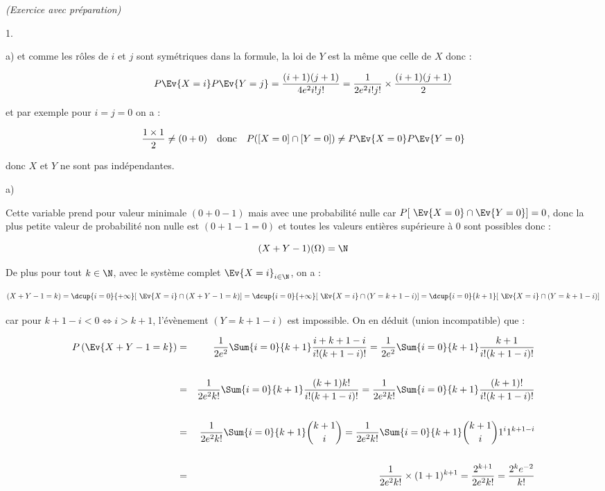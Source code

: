 \documentclass[11pt]{article}%
\begin{document}
\begin{exercice}{\it (Exercice avec préparation)}
\begin{noliste}{1.}
\begin{noliste}{a)}
 et comme les rôles de $i$ et $j$ sont symétriques dans la formule, la
loi de $Y$ est la même que celle de $X$ donc : 
 
\[
 P \Ev{X = i } P \Ev{ Y = j } = \frac{ (i + 1) ( j + 1) }{ 4 e^{2} i!
j! } = \frac{ 1 }{ 2 e^{2} i! j! } \times \frac{ (i + 1 ) (j + 1) }{ 2
} 
\]

 et par exemple pour $i = j = 0$ on a : 
 
\[
 \frac{ 1 \times 1 }{ 2 } \neq (0 + 0) \ \ \text{ donc } \ \ P ( [X =
0] \cap [Y = 0] ) \neq P \Ev{X = 0} P \Ev{ Y = 0 } 
\]

 donc $X$ et $Y$ ne sont pas indépendantes. \\

 \end{noliste}

 \item \begin{noliste}{a)}
 \setlength{\itemsep}{2mm}

 \item Cette variable prend pour valeur minimale $(0 + 0-1)$ mais avec
une probabilité nulle car $P [ \ \Ev{X = 0 } \cap \Ev{Y = 0} ] = 0$,
donc la plus petite valeur de probabilité non nulle est $(0 + 1-1 = 0)$
et toutes les valeurs entières supérieure à 0 sont possibles donc : 
 
\[
 (X + Y - 1) ( \Omega ) = \N 
\]

 De plus pour tout $k \in \N$, avec le système complet $\Ev{X = i}_{i
\in \N}$, on a : 
 
\[
 (X + Y - 1 = k ) = \dcup{i = 0}{+ \infty} [ \ \Ev{X = i} \cap (X + Y-1
= k ) ] = \dcup{i = 0}{+ \infty} [ \ \Ev{X = i} \cap ( Y = k + 1 - i )
] = \dcup{i = 0}{k + 1} [ \ \Ev{X = i} \cap ( Y = k + 1 - i ) ] 
\]

 car pour $k + 1 - i < 0 \Longleftrightarrow i > k + 1$, l'évènement
$(Y = k + 1-i)$ est impossible. On en déduit (union incompatible) que :

 \begin{eqnarray*}
 P \left(\Ev{ X + Y - 1 = k }\right) & = & \frac{ 1 }{ 2e^{2} } \Sum{i
= 0}{k + 1} \frac{ i + k + 1 - i }{ i! (k + 1-i)! } = \frac{ 1 }{
2e^{2} } \Sum{i = 0}{k + 1} \frac{ k + 1 }{ i! (k + 1-i)! } \\
\\
 & = & \frac{ 1 }{ 2e^{2} k! } \Sum{i = 0}{k + 1} \frac{ (k + 1) k! }{
i! (k + 1-i)! } = \frac{ 1 }{ 2e^{2} k! } \Sum{i = 0}{k + 1} \frac{ (k
+ 1)! }{ i! (k + 1-i)! } \\
\\
 & = & \frac{ 1 }{ 2e^{2} k! } \Sum{i = 0}{k + 1} \binom{k + 1}{i} =
\frac{ 1 }{ 2e^{2} k! } \Sum{i = 0}{k + 1} \binom{k + 1}{i} 1^{i} 1^{k
+ 1-i} \\
\\
 & = & \frac{ 1 }{ 2e^{2} k! } \times (1 + 1)^{k + 1} = \frac{ 2^{ k +
1 } }{ 2 e^{2} k! } = \frac{ 2^{k} e^{ - 2 } }{ k! } 
 \end{eqnarray*}


\end{noliste}
\end{noliste}
\end{exercice}
\end{document}
